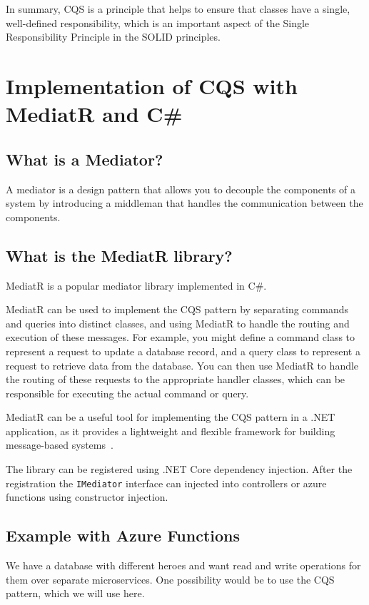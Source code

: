 \documentclass[11pt,conference]{IEEEtran}
\begin{document}
In summary, CQS is a principle that helps to ensure that classes have a single, well-defined responsibility, which is an important aspect of the Single Responsibility Principle in the SOLID principles.

\section{Implementation of CQS with MediatR and C\#}

\subsection{What is a Mediator?}

A mediator is a design pattern that allows you to decouple the components of a system by introducing a middleman that handles the communication between the components.

\subsection{What is the MediatR library?}

MediatR is a popular mediator library implemented in C\#.

MediatR can be used to implement the CQS pattern by separating commands and queries into distinct classes, and using MediatR to handle the routing and execution of these messages. For example, you might define a command class to represent a request to update a database record, and a query class to represent a request to retrieve data from the database. You can then use MediatR to handle the routing of these requests to the appropriate handler classes, which can be responsible for executing the actual command or query.

MediatR can be a useful tool for implementing the CQS pattern in a .NET application, as it provides a lightweight and flexible framework for building message-based systems~\cite{mediatr}.

The library can be registered using .NET Core dependency injection.
After the registration the \texttt{IMediator} interface can injected into controllers or azure functions using constructor injection.

\subsection{Example with Azure Functions}

We have a database with different heroes and want read and write operations for them over separate microservices.
One possibility would be to use the CQS pattern, which we will use here.
\end{document}
